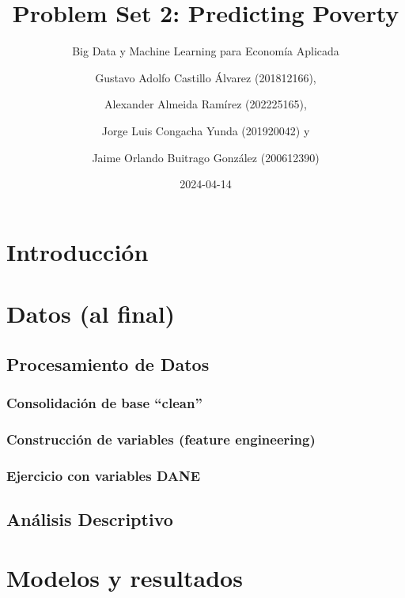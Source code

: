 \documentclass[
  11pt,
  letterpaper,
]{article}
\title{Problem Set 2: Predicting Poverty}
\subtitle{Big Data y Machine Learning para Economía Aplicada}
\author{Gustavo Adolfo Castillo Álvarez (201812166), \and Alexander Almeida Ramírez (202225165), \and Jorge Luis Congacha Yunda (201920042) y \and Jaime Orlando Buitrago González (200612390)}
\date{2024-04-14}
\begin{document}
\maketitle

\hypertarget{introducciuxf3n}{%
\section{Introducción}\label{introducciuxf3n}}

\hypertarget{datos-al-final}{%
\section{Datos (al final)}\label{datos-al-final}}

\hypertarget{procesamiento-de-datos}{%
\subsection{Procesamiento de Datos}\label{procesamiento-de-datos}}

\hypertarget{consolidaciuxf3n-de-base-clean}{%
\subsubsection{Consolidación de base ``clean''}\label{consolidaciuxf3n-de-base-clean}}

\hypertarget{construcciuxf3n-de-variables-feature-engineering}{%
\subsubsection{Construcción de variables (feature engineering)}\label{construcciuxf3n-de-variables-feature-engineering}}

\hypertarget{ejercicio-con-variables-dane}{%
\subsubsection{Ejercicio con variables DANE}\label{ejercicio-con-variables-dane}}

\hypertarget{anuxe1lisis-descriptivo}{%
\subsection{Análisis Descriptivo}\label{anuxe1lisis-descriptivo}}

\hypertarget{modelos-y-resultados}{%
\section{Modelos y resultados}\label{modelos-y-resultados}}
\end{document}
